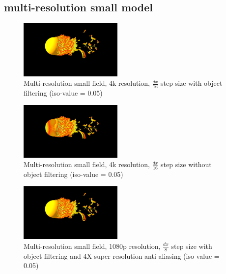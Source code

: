 \documentclass[acmtog]{acmart}
\begin{document}
    \subsection{multi-resolution small model}\label{subsec:multi-resolution-small-model}
    \begin{figure}[H]
        \centering
        \includegraphics[width=0.45\textwidth]{./image/multi_small_4k_16_filter}
        \caption{Multi-resolution small field, 4k resolution, $ \frac{dx}{16} $ step size with object filtering (iso-value = 0.05)}\label{fig:figure5}
    \end{figure}

    \begin{figure}[H]
        \centering
        \includegraphics[width=0.45\textwidth]{./image/multi_small_4k_16_no_filter}
        \caption{Multi-resolution small field, 4k resolution, $ \frac{dx}{16} $ step size without object filtering (iso-value = 0.05)}\label{fig:figure6}
    \end{figure}

    \begin{figure}[H]
        \centering
        \includegraphics[width=0.45\textwidth]{./image/multi_small_1080p_8_filter_4XRES}
        \caption{Multi-resolution small field, 1080p resolution, $ \frac{dx}{8} $ step size with object filtering and 4X super resolution anti-aliasing (iso-value = 0.05)}\label{fig:figure7}
    \end{figure}
\end{document}

